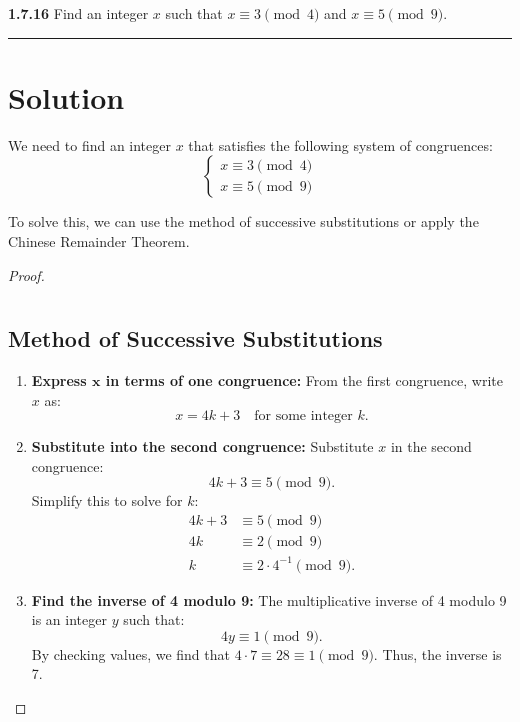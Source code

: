 \documentclass[12pt]{amsart}
\theoremstyle{definition}
\numberwithin{equation}{section}
\begin{document}
\begin{exercise}{\textbf{1.7.16}} Find an integer $x$ such that \(x \equiv 3 \pmod 4\) and \(x \equiv 5\pmod9\).
    
    \noindent\rule{\linewidth}{1pt}

    \vspace*{-10pt}\section*{Solution}

We need to find an integer \(x\) that satisfies the following system of congruences:
\[
\begin{cases}
x \equiv 3 \pmod{4} \\
x \equiv 5 \pmod{9}
\end{cases}
\]

To solve this, we can use the method of successive substitutions or apply the Chinese Remainder Theorem.

\begin{proof} \(\)
    \section*{} \vspace*{-30pt}
\subsection*{Method of Successive Substitutions}
\begin{enumerate}[label=\arabic*.]
    \item \textbf{Express \(\mathbf{x}\) in terms of one congruence:} From the first congruence, write \(x\) as:
\[
x = 4k + 3 \quad \text{for some integer } k.
\]

\item \textbf{Substitute into the second congruence:} Substitute \(x\) in the second congruence:
\[
4k + 3 \equiv 5 \pmod{9}.
\]
Simplify this to solve for \(k\):
\begin{align*}
4k + 3 &\equiv 5 \pmod{9} \\
4k &\equiv 2 \pmod{9} \\
k &\equiv 2 \cdot 4^{-1} \pmod{9}.
\end{align*}

\item \textbf{Find the inverse of 4 modulo 9:} The multiplicative inverse of 4 modulo 9 is an integer \(y\) such that:
\[
4y \equiv 1 \pmod{9}.
\]
By checking values, we find that \(4 \cdot 7 \equiv 28 \equiv 1 \pmod{9}\). Thus, the inverse is 7.


\end{enumerate}
\end{proof}
\end{exercise}
\end{document}
